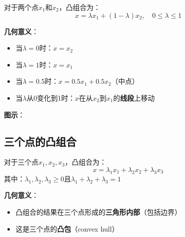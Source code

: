 \documentclass[12pt,a4paper]{article}
\begin{document}
对于两个点$x_1$和$x_2$，凸组合为：
\begin{equation}
x = \lambda x_1 + (1-\lambda) x_2, \quad 0 \leq \lambda \leq 1
\end{equation}

\textbf{几何意义}：
\begin{itemize}
\item 当$\lambda = 0$时：$x = x_2$
\item 当$\lambda = 1$时：$x = x_1$
\item 当$\lambda = 0.5$时：$x = 0.5 x_1 + 0.5 x_2$（中点）
\item 当$\lambda$从0变化到1时：$x$在从$x_2$到$x_1$的\textbf{线段}上移动
\end{itemize}

\textbf{图示}：

\begin{center}
\end{center}

\subsection{三个点的凸组合}

对于三个点$x_1, x_2, x_3$，凸组合为：
\begin{equation}
x = \lambda_1 x_1 + \lambda_2 x_2 + \lambda_3 x_3
\end{equation}
其中：$\lambda_1, \lambda_2, \lambda_3 \geq 0$且$\lambda_1 + \lambda_2 + \lambda_3 = 1$

\textbf{几何意义}：
\begin{itemize}
\item 凸组合的结果在三个点形成的\textbf{三角形内部}（包括边界）
\item 这是三个点的\textbf{凸包}（convex hull）
\end{itemize}
\end{document}

